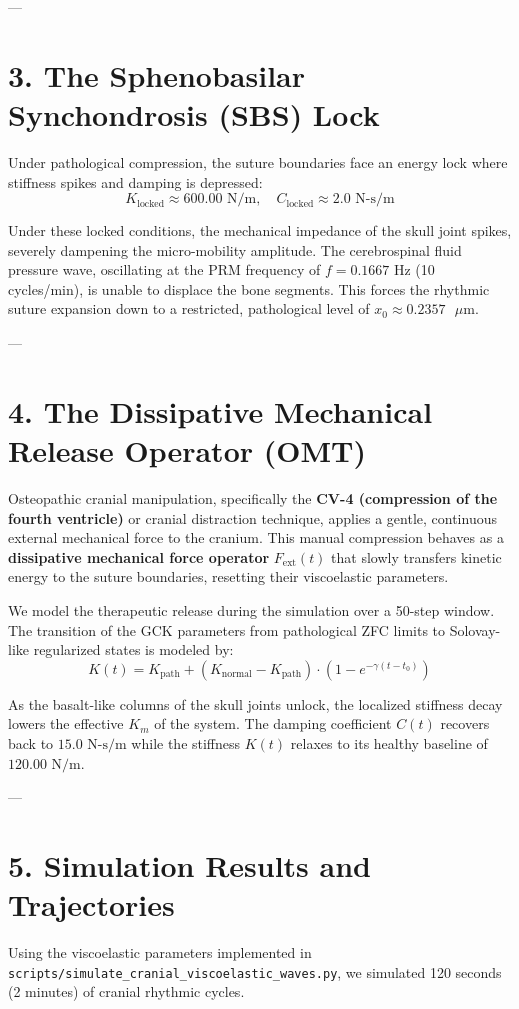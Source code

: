 \documentclass[11pt,twocolumn]{article}
\begin{document}
---

\section{3. The Sphenobasilar Synchondrosis (SBS) Lock}
Under pathological compression, the suture boundaries face an energy lock where stiffness spikes and damping is depressed:
$$K_{\text{locked}} \approx 600.00 \text{ N/m}, \quad C_{\text{locked}} \approx 2.0 \text{ N-s/m}$$

Under these locked conditions, the mechanical impedance of the skull joint spikes, severely dampening the micro-mobility amplitude. The cerebrospinal fluid pressure wave, oscillating at the PRM frequency of $f = 0.1667\text{ Hz}$ (10 cycles/min), is unable to displace the bone segments. This forces the rhythmic suture expansion down to a restricted, pathological level of $x_0 \approx 0.2357\text{ }\mu\text{m}$.

---

\section{4. The Dissipative Mechanical Release Operator (OMT)}
Osteopathic cranial manipulation, specifically the \textbf{CV-4 (compression of the fourth ventricle)} or cranial distraction technique, applies a gentle, continuous external mechanical force to the cranium. This manual compression behaves as a \textbf{dissipative mechanical force operator} $F_{\text{ext}}(t)$ that slowly transfers kinetic energy to the suture boundaries, resetting their viscoelastic parameters.

We model the therapeutic release during the simulation over a 50-step window. The transition of the GCK parameters from pathological ZFC limits to Solovay-like regularized states is modeled by:
$$K(t) = K_{\text{path}} + \left(K_{\text{normal}} - K_{\text{path}}\right) \cdot \left(1 - e^{-\gamma (t - t_0)}\right)$$

As the basalt-like columns of the skull joints unlock, the localized stiffness decay lowers the effective $K_m$ of the system. The damping coefficient $C(t)$ recovers back to $15.0\text{ N-s/m}$ while the stiffness $K(t)$ relaxes to its healthy baseline of $120.00\text{ N/m}$.

---

\section{5. Simulation Results and Trajectories}
Using the viscoelastic parameters implemented in \texttt{scripts/simulate_cranial_viscoelastic_waves.py}, we simulated 120 seconds (2 minutes) of cranial rhythmic cycles.
\end{document}
